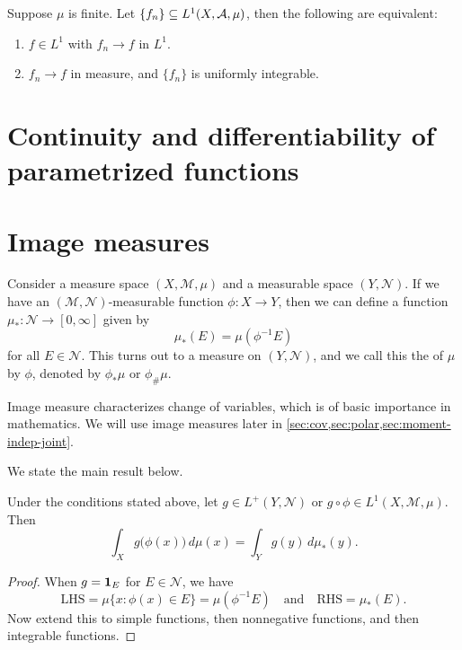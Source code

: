 \begin{namedthm}
    Suppose $\mu$ is finite. Let $\{f_n\} \subseteq L^1(X,\mathcal{A},\mu)$, then the following are equivalent: 
    \begin{enumerate}
        \item $f \in L^1$ with $f_n \to f$ in $L^1$.
        \item $f_n \to f$ in measure, and $\{f_n\}$ is uniformly integrable.
    \end{enumerate}
\end{namedthm}
\section{Continuity and differentiability of parametrized functions}

\section{Image measures} \label{sec:image-measure}
Consider a measure space $(X,\mathcal{M},\mu)$ and a measurable space $(Y,\mathcal{N})$. If we have an $(\mathcal{M},\mathcal{N})$-measurable function $\phi\colon X \to Y$, then we can define a function $\mu_{*}\colon \mathcal{N} \to [0,\infty]$ given by \[
    \mu_{*}(E) =  \mu(\phi^{-1}E)
\] for all $E\in \mathcal{N}$. This turns out to a measure on $(Y,\mathcal N)$, and we call this the  of $\mu$ by $\phi$, denoted by $\phi_*\mu$ or $\phi_{\#}\mu$.

Image measure characterizes change of variables, which is of basic importance in mathematics. We will use image measures later in \cref{sec:cov,sec:polar,sec:moment-indep-joint}.

We state the main result below.
\begin{prop} \label{prop:image-meas-cov}
    Under the conditions stated above, let $g\in L^+(Y,\mathcal{N})$ or $g \circ \phi \in L^1(X,\mathcal{M},\mu)$. Then \begin{equation*}
        \int_X g\bigl(\phi(x)\bigr) \,d\mu(x) = \int_Y g(y) \,d\mu_*(y). %
    \end{equation*}
\end{prop}
\begin{proof}
    When $g = \mathbf{1}_E$ for $E \in \mathcal{N}$, we have \[
        \text{LHS} = \mu\{x : \phi(x) \in E\} = \mu(\phi^{-1} E) \quad \text{and} \quad 
        \text{RHS} = \mu_{*}(E).
    \] Now extend this to simple functions, then nonnegative functions, and then integrable functions.
\end{proof}